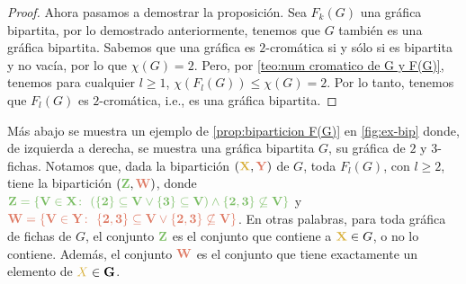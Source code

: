 \begin{proof}
    Ahora pasamos a demostrar la proposici\'on. Sea $F_k(G)$ una gr\'afica
    bipartita, por lo demostrado anteriormente, tenemos que $G$ tambi\'en es una
    gr\'afica bipartita. Sabemos que una gr\'afica es $2$-crom\'atica si y
    s\'olo si es bipartita y no vac\'ia, por lo que $\chi(G)=2$. Pero, por
    \cref{teo:num cromatico de G y F(G)}, tenemos para cualquier $l\geq 1$,
    $\chi (F_l(G)) \le \chi (G) = 2$. Por lo tanto, tenemos que $F_l(G)$ es
    $2$-crom\'atica, i.e., es una gr\'afica bipartita.
\end{proof}


M\'as abajo se muestra un ejemplo de \cref{prop:biparticion F(G)} en
\cref{fig:ex-bip} donde, de izquierda a derecha, se muestra una gr\'afica
bipartita $G$, su gr\'afica de $2$ y $3$-fichas. Notamos que, dada la
bipartici\'on $({\color{oro}\bf X},{\color{salmon}\bf Y})$ de $G$, toda $F_l(G)$, con
$l\geq 2$, tiene la bipartici\'on $({\color{verde} \bf Z},{\color{salmon}\bf W})$, donde
${\color{verde}\bf Z=\{V\in X\colon\ (\{2\}\subseteq V  \lor \{3\} \subseteq V)
\land \{2,3\}\not\subseteq V\}}$ y ${\color{salmon}\bf W=\{V \in Y\colon\
\{2,3\}\subseteq V \lor \{2,3\}\not\subseteq V\}}$. En otras palabras, para toda
gr\'afica de fichas de $G$, el conjunto ${\color{verde}\bf Z}$ es el conjunto que
contiene a ${\color{oro}\bf X}\in G$, o no lo contiene. Adem\'as, el conjunto
${\color{salmon}\bf W}$ es el conjunto que tiene exactamente un elemento de
${\color{oro}X}\bf \in G$.

